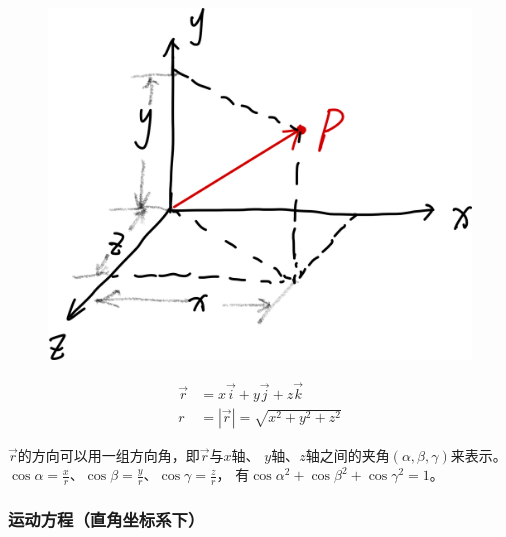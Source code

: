 \documentclass[
	12pt, %
	fleqn, %
	a4paper, %
]{myLegrandOrangeBook}
\begin{document}
    \begin{figure}
        \centering
        \includegraphics[scale=0.08]{"Chapter 01 images/pic1.png"}
        \label{pic1}
    \end{figure}

    \begin{align}
        \overrightarrow{r} &= x\overrightarrow{i} + y\overrightarrow{j} + z\overrightarrow{k} \\
        r &= \left|\overrightarrow{r}\right| = \sqrt{x^2 + y^2 + z^2}
    \end{align}

    \(\overrightarrow{r}\)的方向可以用一组方向角，即\(\overrightarrow{r}\)与\(x\)轴、
    \(y\)轴、\(z\)轴之间的夹角\(\left(\alpha, \beta, \gamma\right)\)来表示。
    \(\cos \alpha = \frac{x}{r}\)、\(\cos \beta = \frac{y}{r}\)、\(\cos \gamma = \frac{z}{r}\)，
    有\(\cos \alpha ^2 + \cos \beta ^2 + \cos \gamma ^2 = 1\)。

\subsubsection*{运动方程（直角坐标系下）}
    
\end{document}
